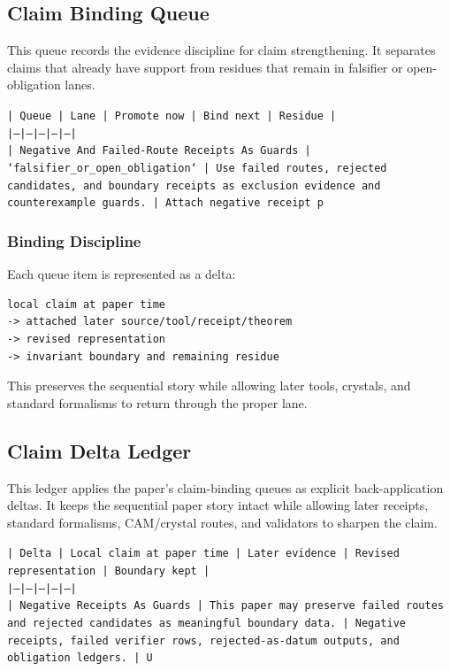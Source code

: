 \documentclass[11pt]{article}
\begin{document}
\subsection*{Claim Binding Queue}

This queue records the evidence discipline for claim strengthening. It separates claims that already have support from residues that remain in falsifier or open-obligation lanes.

\noindent\texttt{| Queue | Lane | Promote now | Bind next | Residue |}\\
\noindent\texttt{|---|---|---|---|---|}\\
\noindent\texttt{| Negative And Failed-Route Receipts As Guards | `falsifier\_or\_open\_obligation` | Use failed routes, rejected candidates, and boundary receipts as exclusion evidence and counterexample guards. | Attach negative receipt p}\\

\subsubsection*{Binding Discipline}

Each queue item is represented as a delta:

\begin{verbatim}
local claim at paper time
-> attached later source/tool/receipt/theorem
-> revised representation
-> invariant boundary and remaining residue
\end{verbatim}

This preserves the sequential story while allowing later tools, crystals, and
standard formalisms to return through the proper lane.

\subsection*{Claim Delta Ledger}

This ledger applies the paper's claim-binding queues as explicit back-application
deltas. It keeps the sequential paper story intact while allowing later
receipts, standard formalisms, CAM/crystal routes, and validators to sharpen the
claim.

\noindent\texttt{| Delta | Local claim at paper time | Later evidence | Revised representation | Boundary kept |}\\
\noindent\texttt{|---|---|---|---|---|}\\
\noindent\texttt{| Negative Receipts As Guards | This paper may preserve failed routes and rejected candidates as meaningful boundary data. | Negative receipts, failed verifier rows, rejected-as-datum outputs, and obligation ledgers. | U}\\
\end{document}
